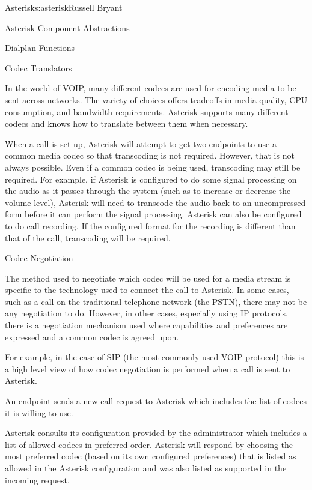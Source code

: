 \begin{aosachapter}{Asterisk}{s:asterisk}{Russell Bryant}
\begin{aosasect1}{Asterisk Component Abstractions}
\begin{aosasect2}{Dialplan Functions}
\end{aosasect2}

\pagebreak

\begin{aosasect2}{Codec Translators}

In the world of VOIP, many different codecs are used for
encoding media to be sent across networks. The variety of choices
offers tradeoffs in media quality, CPU consumption, and bandwidth
requirements. Asterisk supports many different codecs and knows how to
translate between them when necessary.

When a call is set up, Asterisk will attempt to get two endpoints to
use a common media codec so that transcoding is not required.
However, that is not always possible. Even if a common codec is being
used, transcoding may still be required. For example, if Asterisk is
configured to do some signal processing on the audio as it passes
through the system (such as to increase or decrease the volume level),
Asterisk will need to transcode the audio back to an uncompressed form
before it can perform the signal processing. Asterisk can also be
configured to do call recording. If the configured format for the
recording is different than that of the call, transcoding will be
required.

\begin{aosabox}{Codec Negotiation}

The method used to negotiate which codec will be used for a media
stream is specific to the technology used to connect the call to
Asterisk. In some cases, such as a call on the traditional telephone
network (the PSTN), there may not be any negotiation to do. However,
in other cases, especially using IP protocols, there is a negotiation
mechanism used where capabilities and preferences are expressed and a
common codec is agreed upon.

For example, in the case of SIP (the most commonly used VOIP
protocol) this is a high level view of how codec negotiation is
performed when a call is sent to Asterisk.

\begin{aosaenumerate}

  \item An endpoint sends a new call request to Asterisk which includes
  the list of codecs it is willing to use.

  \item Asterisk consults its configuration provided by the
  administrator which includes a list of allowed codecs in preferred
  order. Asterisk will respond by choosing the most preferred codec
  (based on its own configured preferences) that is listed as allowed
  in the Asterisk configuration and was also listed as supported in
  the incoming request.


\end{aosaenumerate}
\end{aosabox}
\end{aosasect2}
\end{aosasect1}
\end{aosachapter}
